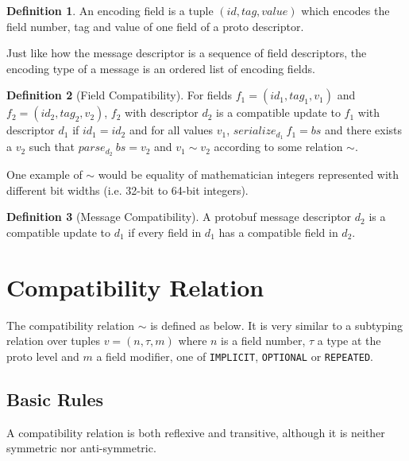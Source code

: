 \documentclass[11pt]{article}
\theoremstyle{definition}
\newtheorem{definition}{Definition}[section]
\begin{document}
\begin{definition}
	An encoding field is a tuple $(id, tag, value)$ which encodes the field
	number, tag and value of one field of a proto descriptor.
\end{definition}

Just like how the message descriptor is a sequence of field descriptors, the
encoding type of a message is an ordered list of encoding fields.

\begin{definition}[Field Compatibility]
	For fields $f_1 = (id_1, tag_1, v_1)$ and $f_2 = (id_2, tag_2, v_2)$, $f_2$
	with descriptor $d_2$ is a compatible update to $f_1$ with descriptor $d_1$ if
	$id_1 = id_2$ and for all values $v_1$, $serialize_{d_1}\ f_1 = bs$ and there
	exists a $v_2$ such that $parse_{d_2}\ bs = v_2$ and $v_1 \sim v_2$ according to
	some relation $\sim$.
\end{definition}

One example of $\sim$ would be equality of mathematician integers represented with
different bit widths (i.e. 32-bit to 64-bit integers).

\begin{definition}[Message Compatibility]
	A protobuf message descriptor $d_2$ is a compatible update to $d_1$ if every
	field in $d_1$ has a compatible field in $d_2$.
\end{definition}

\section{Compatibility Relation}

The compatibility relation $\sim$ is defined as below. It is very similar to a
subtyping relation over tuples $v = (n, \tau, m)$ where $n$ is a field number, $\tau$
a type at the proto level and $m$ a field modifier, one of \texttt{IMPLICIT},
\texttt{OPTIONAL} or \texttt{REPEATED}. 

\subsection{Basic Rules}

A compatibility relation is both reflexive and transitive, although it is
neither symmetric nor anti-symmetric.  

\begin{mathpar}

\end{mathpar}
\end{document}
